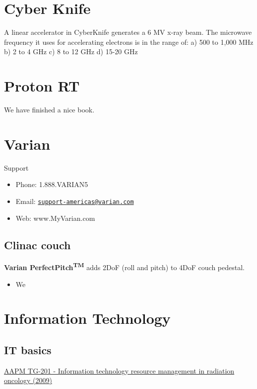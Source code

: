 \documentclass[]{book}
\providecommand{\tightlist}{%
  \setlength{\itemsep}{0pt}\setlength{\parskip}{0pt}}
\theoremstyle{definition}
\theoremstyle{definition}
\theoremstyle{definition}
\theoremstyle{remark}
\begin{document}
\chapter{Cyber Knife}\label{cyber-knife}

A linear accelerator in CyberKnife generates a 6 MV x-ray beam. The
microwave frequency it uses for accelerating electrons is in the range
of: a) 500 to 1,000 MHz b) 2 to 4 GHz c) 8 to 12 GHz d) 15-20 GHz

\chapter{Proton RT}\label{proton}

We have finished a nice book.

\chapter{Varian}\label{varian}

Support

\begin{itemize}
\tightlist
\item
  Phone: 1.888.VARIAN5
\item
  Email:
  \href{mailto:support-americas@varian.com}{\nolinkurl{support-americas@varian.com}}
\item
  Web: www.MyVarian.com
\end{itemize}

\section{Clinac couch}\label{clinac-couch}

\textbf{Varian PerfectPitch\textsuperscript{TM}} adds 2DoF (roll and
pitch) to 4DoF couch pedestal.

\begin{itemize}
\tightlist
\item
  We
\end{itemize}

\chapter{Information Technology}\label{it}

\section{IT basics}\label{it-basics}

\href{https://www.aapm.org/pubs/reports/detail.asp?docid=142}{AAPM
TG-201 - Information technology resource management in radiation
oncology (2009)}
\end{document}
